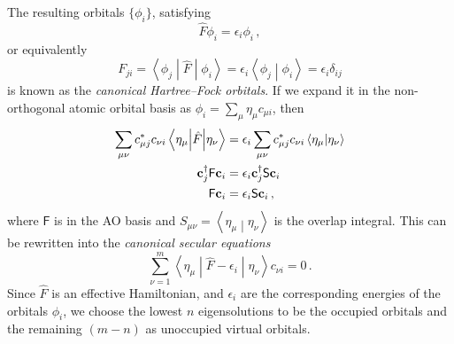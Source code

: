 \documentclass{article}
\theoremstyle{plain}\theoremheaderfont{\normalfont\itshape}\theorembodyfont{\rmfamily}\theoremseparator{.}\newtheorem*{rem}{Remark}\newtheorem*{ex}{Example}\newtheorem*{proof}{Proof}\newtheorem*{altp}{Alternative proof}
\theoremstyle{plain}\theoremheaderfont{\normalfont\bfseries}\theorembodyfont{\rmfamily}\theoremseparator{.}\newtheorem{thm}{Theorem}[section]\newtheorem{lem}[thm]{Lemma}\newtheorem{prop}[thm]{Proposition}\newtheorem*{cor}{Corollary}\newtheorem{defn}[thm]{Definition}\newtheorem{clm}[thm]{Claim}\newtheorem{clminproof}{Claim}
\theoremstyle{break}\theoremheaderfont{\normalfont\itshape}\theorembodyfont{\rmfamily}\theoremseparator{.\medskip}\newtheorem*{proofskip}{Proof}\newtheorem*{exs}{Examples}\newtheorem*{rems}{Remarks}
\theoremstyle{break}\theoremheaderfont{\normalfont\bfseries}\theorembodyfont{\rmfamily}\theoremseparator{.\medskip}\newtheorem{lemskip}[thm]{Lemma}\newtheorem{defnskip}[thm]{Definition}\newtheorem{propskip}[thm]{Proposition}\newtheorem{thmskip}[thm]{Theorem}
\numberwithin{equation}{section}
\newcommand{\braket}[2]{\left\langle #1 \middle| #2 \right\rangle}
\newcommand{\mel}[3]{\left\langle #1 \middle| #2 \middle| #3 \right\rangle}
\newcommand{\vb}[1]{\bm{\mathrm{#1}}}
\begin{document}
    The resulting orbitals \(\{\phi_i\}\), satisfying
    \begin{equation}
        \hat{F}\phi_i=\epsilon_i\phi_i\,,
    \end{equation}
    or equivalently
    \begin{equation}
        F_{ji}=\mel{\phi_j}{\hat{F}}{\phi_i}=\epsilon_i\braket{\phi_j}{\phi_i}=\epsilon_i\delta_{ij}
    \end{equation}
    is known as the \textit{canonical Hartree--Fock orbitals}. If we expand it in the non-orthogonal atomic orbital basis as \(\phi_i=\sum_\mu\eta_\mu c_{\mu i}\), then
    \begin{align}
        \sum_{\mu\nu}c_{\mu j}^*c_{\nu i}\mel{\eta_\mu}{\hat{F}}{\eta_\nu}&=\epsilon_i\sum_{\mu\nu}c_{\mu j}^* c_{\nu i}\braket{\eta_\mu}{\eta_\nu}\notag\\
        \vb{c}_j^\dagger\mathsf{F}\vb{c}_i&=\epsilon_i\vb{c}_j^\dagger\mathsf{S}\vb{c}_i\notag\\
        \mathsf{F}\vb{c}_i&=\epsilon_i\mathsf{S}\vb{c}_i\,,
    \end{align}
    where \(\mathsf{F}\) is in the AO basis and \(S_{\mu\nu}=\braket{\eta_\mu}{\eta_\nu}\) is the overlap integral. This can be rewritten into the \textit{canonical secular equations}
    \begin{equation}\label{HF_SCF_secular}
        \sum_{\nu=1}^{m}\mel{\eta_\mu}{\hat{F}-\epsilon_i}{\eta_\nu}c_{\nu i}=0\,.
    \end{equation}
    Since \(\hat{F}\) is an effective Hamiltonian, and \(\epsilon_i\) are the corresponding energies of the orbitals \(\phi_i\), we choose the lowest \(n\) eigensolutions to be the occupied orbitals and the remaining \((m-n)\) as unoccupied virtual orbitals.
\end{document}
